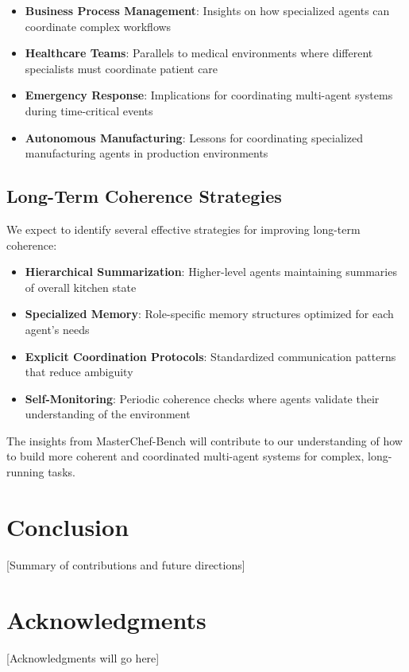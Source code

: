 \documentclass{article}
\begin{document}
\begin{itemize}
    \item \textbf{Business Process Management}: Insights on how specialized agents can coordinate complex workflows
    \item \textbf{Healthcare Teams}: Parallels to medical environments where different specialists must coordinate patient care
    \item \textbf{Emergency Response}: Implications for coordinating multi-agent systems during time-critical events
    \item \textbf{Autonomous Manufacturing}: Lessons for coordinating specialized manufacturing agents in production environments
\end{itemize}

\subsection{Long-Term Coherence Strategies}

We expect to identify several effective strategies for improving long-term coherence:

\begin{itemize}
    \item \textbf{Hierarchical Summarization}: Higher-level agents maintaining summaries of overall kitchen state
    \item \textbf{Specialized Memory}: Role-specific memory structures optimized for each agent's needs
    \item \textbf{Explicit Coordination Protocols}: Standardized communication patterns that reduce ambiguity
    \item \textbf{Self-Monitoring}: Periodic coherence checks where agents validate their understanding of the environment
\end{itemize}

The insights from MasterChef-Bench will contribute to our understanding of how to build more coherent and coordinated multi-agent systems for complex, long-running tasks.

\section{Conclusion}
\label{sec:conclusion}
[Summary of contributions and future directions]

\section*{Acknowledgments}
[Acknowledgments will go here]
\end{document}
